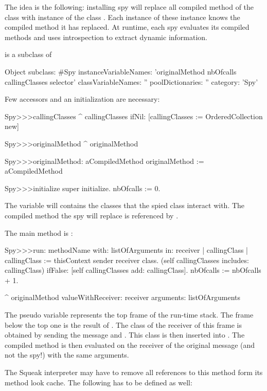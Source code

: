 \documentclass[a4paper,10pt,twoside]{book}
\begin{document}
The idea is the following: installing spy will replace all compiled method of the class with instance of the class . Each instance of these instance knows the compiled method it has replaced. At runtime, each spy evaluates its compiled methods and uses introspection to extract dynamic information.

 is a subclass of 
\begin{code}{}
Object subclass: #Spy
	instanceVariableNames: 'originalMethod nbOfcalls callingClasses selector'
	classVariableNames: ''
	poolDictionaries: ''
	category: 'Spy'
\end{code}

Few accessors and an initialization are necessary:
\begin{code}{}
Spy>>>callingClasses
	^ callingClasses ifNil: [callingClasses := OrderedCollection new]

Spy>>>originalMethod
	^ originalMethod

Spy>>>originalMethod: aCompiledMethod
	originalMethod := aCompiledMethod 

Spy>>>initialize
	super initialize.
	nbOfcalls := 0.
\end{code}

The variable  will contains the classes that the spied class interact with. The compiled method the spy will replace is referenced by .

The main method is :
\begin{code}{}
Spy>>>run: methodName with: listOfArguments in: receiver
	| callingClass |
	callingClass := thisContext sender receiver class.
	(self callingClasses includes: callingClass)
		ifFalse: [self callingClasses add: callingClass].
	nbOfcalls := nbOfcalls + 1.
		
	^ originalMethod valueWithReceiver: receiver arguments: listOfArguments 
\end{code}

The pseudo variable  represents the top frame of the run-time stack. The frame below the top one is the result of . The class of the receiver of this frame is obtained by sending the message  and . This class is then inserted into . The compiled method is then evaluated on the receiver of the original message (and not the spy!) with the same arguments.

The Squeak interpreter may have to remove all references to this method form its method look cache. The following has to be defined as well:
\end{document}
